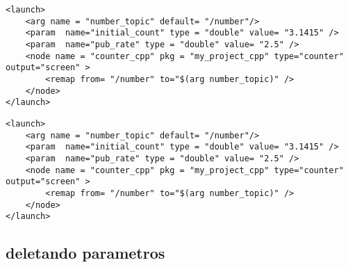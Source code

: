 \documentclass[letterpaper]{article}
\begin{document}
\begin{lstlisting}[style=xmlstyle, title=counter\_cpp.launch]
<launch>
    <arg name = "number_topic" default= "/number"/>
    <param  name="initial_count" type = "double" value= "3.1415" />
    <param  name="pub_rate" type = "double" value= "2.5" />
    <node name = "counter_cpp" pkg = "my_project_cpp" type="counter" output="screen" >   
        <remap from= "/number" to="$(arg number_topic)" />  
    </node> 
</launch>
\end{lstlisting}

\begin{lstlisting}[style=xmlstyle, title=number\_publisher\_cpp.launch]
<launch>
    <arg name = "number_topic" default= "/number"/>
    <param  name="initial_count" type = "double" value= "3.1415" />
    <param  name="pub_rate" type = "double" value= "2.5" />
    <node name = "counter_cpp" pkg = "my_project_cpp" type="counter" output="screen" >   
        <remap from= "/number" to="$(arg number_topic)" />  
    </node> 
</launch>
\end{lstlisting}
\subsection{deletando parametros}
\end{document}

